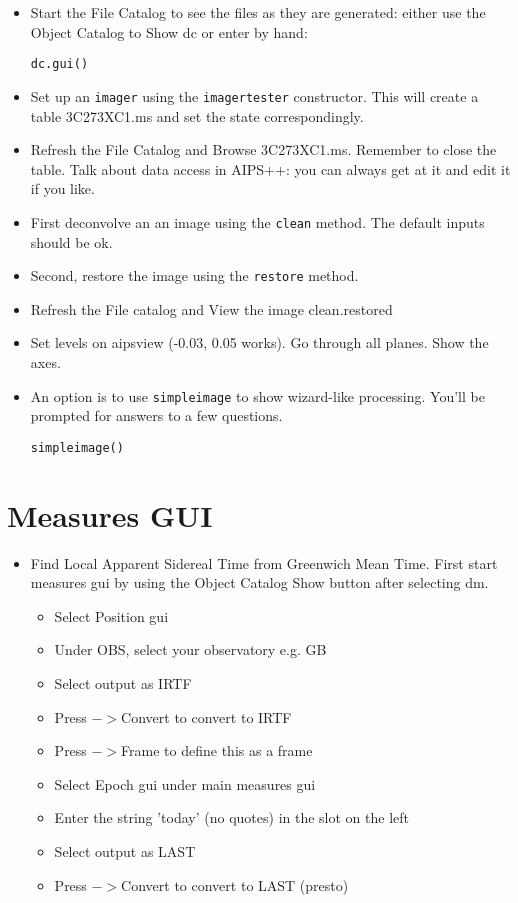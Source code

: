 \begin{itemize}
\item Start the File Catalog to see the files as they are generated:
either use the Object Catalog to Show dc or enter by hand:
\begin{verbatim}
dc.gui()
\end{verbatim}
\item Set up an {\tt imager} using the {\tt imagertester} constructor. This will
create a table 3C273XC1.ms and set the state correspondingly.
\item Refresh the File Catalog and Browse 3C273XC1.ms. Remember to close the table. Talk about
data access in AIPS++: you can always get at it and edit it if you like.
\item First deconvolve an an image using the {\tt clean} method. The
default inputs should be ok.
\item Second, restore the image using the {\tt restore} method.
\item Refresh the File catalog and View the image clean.restored
\item Set levels on aipsview (-0.03, 0.05 works). Go through all
planes. Show the axes.
\item An option is to use {\tt simpleimage} to show wizard-like
processing. You'll be prompted for answers to a few questions.
\begin{verbatim}
simpleimage()
\end{verbatim}
\end{itemize}

\section{Measures GUI}

\begin{itemize}
\item Find Local Apparent Sidereal Time from Greenwich Mean Time. First start 
measures gui by using the Object Catalog Show button after selecting dm.
\begin{itemize}
\item Select Position gui
\item Under OBS, select your observatory e.g. GB
\item Select output as IRTF
\item Press $->$Convert to convert to IRTF
\item Press $->$Frame to define this as a frame
\item Select Epoch gui under main measures gui
\item Enter the string 'today' (no quotes) in the slot on
the left
\item Select output as LAST
\item Press $->$Convert to convert to LAST (presto)
\end{itemize}
\end{itemize}

